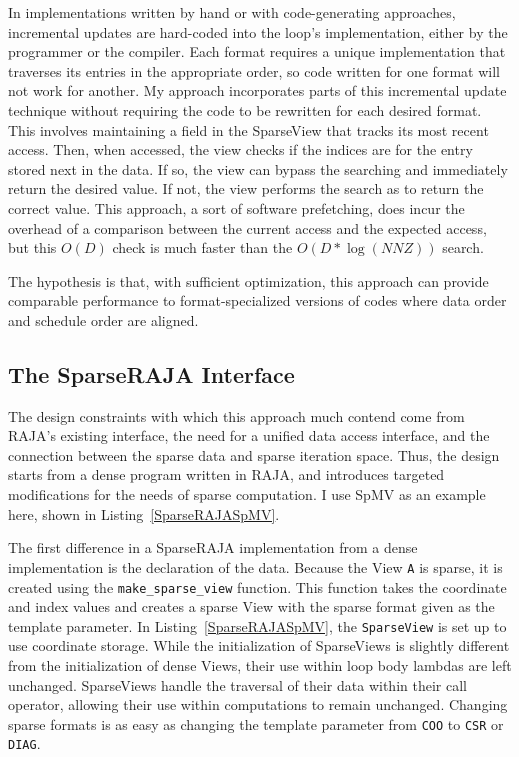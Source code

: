 In implementations written by hand or with code-generating approaches, incremental updates are hard-coded into the loop's implementation, either by the programmer or the compiler.
Each format requires a unique implementation that traverses its entries in the appropriate order, so code written for one format will not work for another.
My approach incorporates parts of this incremental update technique without requiring the code to be rewritten for each desired format. 
This involves maintaining a field in the SparseView that tracks its most recent access.
Then, when accessed, the view checks if the indices are for the entry stored next in the data. 
If so, the view can bypass the searching and immediately return the desired value. 
If not, the view performs the search as to return the correct value. 
This approach, a sort of software prefetching, does incur the overhead of a comparison between the current access and the expected access, but this $O(D)$ check is much faster than the $O(D*\log(NNZ))$ search.

The hypothesis is that, with sufficient optimization, this approach can provide comparable performance to format-specialized versions of codes where data order and schedule order are aligned.

\subsection{The SparseRAJA Interface}

The design constraints with which this approach much contend come from RAJA's existing interface, the need for a unified data access interface, and the connection between the sparse data and sparse iteration space.
Thus, the design starts from a dense program written in RAJA, and introduces targeted modifications for the needs of sparse computation.
I use SpMV as an example here, shown in Listing~\ref{SparseRAJASpMV}.

The first difference in a SparseRAJA implementation from a dense implementation is the declaration of the data.
Because the View \verb.A. is sparse, it is created using the \verb.make_sparse_view. function.
This function takes the coordinate and index values and creates a sparse View with the sparse format given as the template parameter. 
In Listing~\ref{SparseRAJASpMV}, the \verb.SparseView. is set up to use coordinate storage.
While the initialization of SparseViews is slightly different from the initialization of dense Views, their use within loop body lambdas are left unchanged. 
SparseViews handle the traversal of their data within their call operator, allowing their use within computations to remain unchanged.
Changing sparse formats is as easy as changing the template parameter from \verb.COO. to \verb.CSR. or \verb.DIAG..

